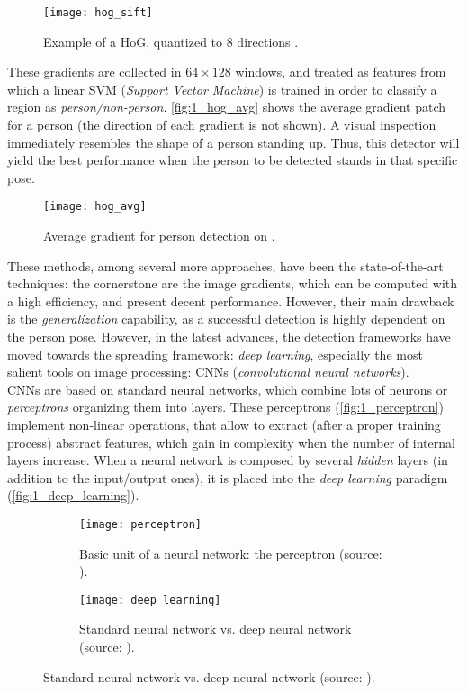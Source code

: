 \begin{figure}[h]
	\centering
	\texttt{[image: hog\_sift]}
	\caption{Example of a HoG, quantized to 8 directions \cite{diapos_cv_features}.}
	\label{fig:1_hog_sift}
\end{figure}



These gradients are collected in $64 \times 128$ windows, and treated as features from which a linear SVM (\textit{Support Vector Machine}) is trained in order to classify a region as \textit{person/non-person}. \autoref{fig:1_hog_avg} shows the average gradient patch for a person (the direction of each gradient is not shown). A visual inspection immediately resembles the shape of a person standing up. Thus, this detector will yield the best performance when the person to be detected stands in that specific pose.

\begin{figure}[h]
	\centering
	\texttt{[image: hog\_avg]}
	\caption{Average gradient for person detection on \cite{hog_detection}.}
	\label{fig:1_hog_avg}
\end{figure}

These methods, among several more approaches, have been the state-of-the-art techniques: the cornerstone are the image gradients, which can be computed with a high efficiency,  and present decent performance. However, their main drawback is the \textit{generalization} capability, as a successful detection is highly dependent on the person pose. However, in the latest advances, the detection frameworks have moved towards the spreading framework: \textit{deep learning}, especially the most salient tools on image processing: CNNs (\textit{convolutional neural networks}).\\

CNNs are based on standard neural networks, which combine lots of neurons or \textit{perceptrons} organizing them into layers. These perceptrons (\autoref{fig:1_perceptron}) implement non-linear operations, that allow to extract (after a proper training process) abstract features, which gain in complexity when the number of internal layers increase. When a neural network is composed by several \textit{hidden} layers (in addition to the input/output ones), it is placed into the \textit{deep learning} paradigm (\autoref{fig:1_deep_learning}).

\begin{figure}[h]
	\centering
	\begin{subfigure}[t]{0.35\linewidth}
		\centering
		\texttt{[image: perceptron]}
		\caption{Basic unit of a neural network: the perceptron (source: \cite{tfg}).}
		\label{fig:1_perceptron}
	\end{subfigure}
	\begin{subfigure}[t]{0.5\linewidth}
		\centering
		\texttt{[image: deep\_learning]}
		\caption{Standard neural network vs. deep neural network (source: \cite{tfg}).}
		\label{fig:1_deep_learning}
	\end{subfigure}
\end{figure}

